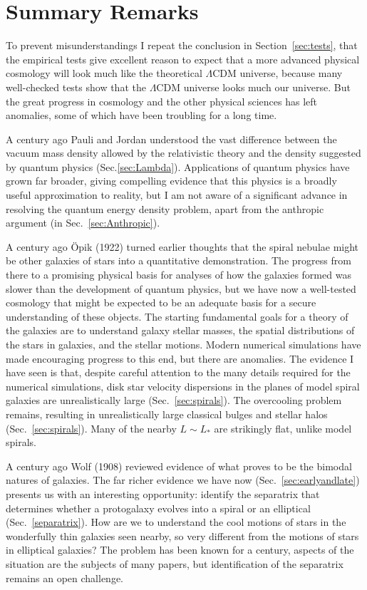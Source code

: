 \documentclass[fleqn,usenatbib]{mnras}
\begin{document}
\section{Summary Remarks}\label{SummaryRemarks}

To prevent misunderstandings I repeat the conclusion in Section~\ref{sec:tests}, that the empirical tests give excellent reason to expect that a more advanced physical cosmology will look much like the theoretical $\Lambda$CDM universe, because many well-checked tests show that the $\Lambda$CDM universe looks much our universe. But the great progress in cosmology and the other physical sciences has left anomalies, some of which have been troubling for a long time. 

A century ago Pauli and Jordan understood the vast difference between the vacuum mass density allowed by the relativistic theory and the density suggested by quantum physics (Sec.\ref{sec:Lambda}). Applications of quantum physics have grown far broader, giving compelling evidence that this physics is a broadly useful approximation to reality, but I am not aware of a significant advance in resolving the quantum energy density problem, apart from the anthropic argument (in Sec.~\ref{sec:Anthropic}). 

A century ago \"Opik (1922) turned earlier thoughts that the spiral nebulae might be other galaxies of stars into a quantitative demonstration. The progress from there to a promising physical basis for analyses of how the galaxies formed was slower than the development of quantum physics, but we have now a well-tested cosmology that might be expected to be an adequate basis for a secure understanding of these objects. The starting fundamental goals for a theory of the galaxies are to understand galaxy stellar masses, the spatial distributions of the stars in galaxies, and the stellar motions. Modern numerical simulations have made encouraging progress to this end, but there are anomalies. The evidence I have seen is that, despite careful attention to the many details required for the numerical simulations, disk star velocity dispersions in the planes of model spiral galaxies are unrealistically large (Sec.~\ref{sec:spirals}). The overcooling problem remains, resulting in unrealistically large classical bulges and stellar halos (Sec.~\ref{sec:spirals}). Many of the nearby $L\sim L_\ast$ are strikingly flat, unlike model spirals. 

A century ago Wolf (1908) reviewed evidence of what proves to be the bimodal natures of galaxies. The far richer evidence we have now (Sec.~\ref{sec:earlyandlate}) presents us with an interesting opportunity: identify the separatrix that determines whether a protogalaxy evolves into a spiral or an elliptical (Sec.~\ref{separatrix}). How are we to understand the cool motions of stars in the wonderfully thin galaxies seen nearby, so very different from the motions of stars in elliptical galaxies? The problem has been known for a century, aspects of the situation are the subjects of many papers, but identification of the separatrix remains an open challenge.
\end{document}
